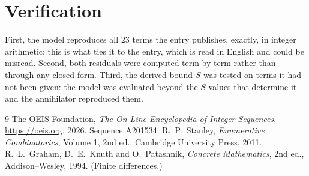 \documentclass[11pt,a4paper]{article}
\theoremstyle{plain}
\theoremstyle{definition}
\begin{document}
\section{Verification}

First, the model reproduces all $23$ terms the entry publishes, exactly, in integer
arithmetic; this is what ties it to the entry, which is read in English and could be misread.
Second, both residuals were computed term by term rather than through any closed form. Third,
the derived bound $S$ was tested on terms it had not been given: the model was evaluated beyond
the $S$ values that determine it and the annihilator reproduced them.

\begin{thebibliography}{9}
 The OEIS Foundation, \emph{The On-Line Encyclopedia of Integer Sequences},
\url{https://oeis.org}, 2026. Sequence A201534.
 R.~P.~Stanley, \emph{Enumerative Combinatorics}, Volume 1, 2nd ed.,
Cambridge University Press, 2011.
 R.~L.~Graham, D.~E.~Knuth and O.~Patashnik, \emph{Concrete Mathematics},
2nd ed., Addison--Wesley, 1994. (Finite differences.)
\end{thebibliography}
\end{document}
